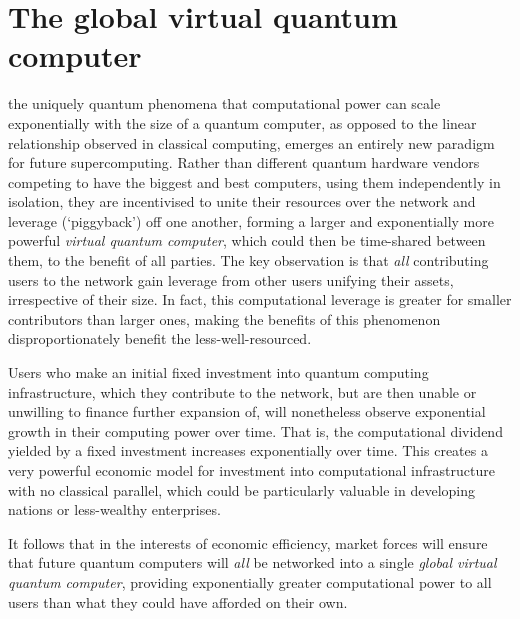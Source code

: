 \section{The global virtual quantum computer} \label{sec:GVQC} 

\newline

 the uniquely quantum phenomena that computational power can scale exponentially with the size of a quantum computer, as opposed to the linear relationship observed in classical computing, emerges an entirely new paradigm for future supercomputing. Rather than different quantum hardware vendors competing to have the biggest and best computers, using them independently in isolation, they are incentivised to unite their resources over the network and leverage (`piggyback') off one another, forming a larger and exponentially more powerful \textit{virtual quantum computer}, which could then be time-shared between them, to the benefit of all parties. The key observation is that \textit{all} contributing users to the network gain leverage from other users unifying their assets, irrespective of their size. In fact, this computational leverage is greater for smaller contributors than larger ones, making the benefits of this phenomenon disproportionately benefit the less-well-resourced. 

Users who make an initial fixed investment into quantum computing infrastructure, which they contribute to the network, but are then unable or unwilling to finance further expansion of, will nonetheless observe exponential growth in their computing power over time. That is, the computational dividend yielded by a fixed investment increases exponentially over time. This creates a very powerful economic model for investment into computational infrastructure with no classical parallel, which could be particularly valuable in developing nations or less-wealthy enterprises.

It follows that in the interests of economic efficiency, market forces will ensure that future quantum computers will \textit{all} be networked into a single \textit{global virtual quantum computer}, providing exponentially greater computational power to all users than what they could have afforded on their own.

